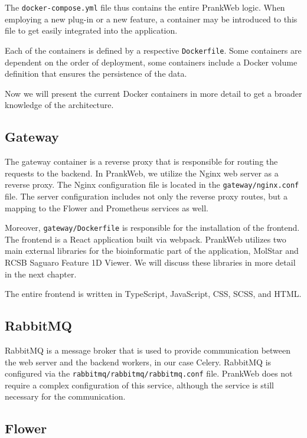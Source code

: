 The \texttt{docker-compose.yml} file thus contains the entire PrankWeb logic. When employing a new plug-in or a new feature, a container may be introduced to this file to get easily integrated into the application.

Each of the containers is defined by a respective \texttt{Dockerfile}. Some containers are dependent on the order of deployment, some containers include a Docker volume definition that ensures the persistence of the data.

Now we will present the current Docker containers in more detail to get a broader knowledge of the architecture.

\subsection{Gateway}

The gateway container is a reverse proxy that is responsible for routing the requests to the backend. In PrankWeb, we utilize the Nginx web server as a reverse proxy. The Nginx configuration file is located in the \texttt{gateway/nginx.conf} file. The server configuration includes not only the reverse proxy routes, but a mapping to the Flower and Prometheus services as well.

Moreover, \texttt{gateway/Dockerfile} is responsible for the installation of the frontend. The frontend is a React application built via webpack. PrankWeb utilizes two main external libraries for the bioinformatic part of the application, MolStar and RCSB Saguaro Feature 1D Viewer. We will discuss these libraries in more detail in the next chapter.

The entire frontend is written in TypeScript, JavaScript, CSS, SCSS, and HTML.

\subsection{RabbitMQ}

RabbitMQ is a message broker that is used to provide communication between the web server and the backend workers, in our case Celery. RabbitMQ is configured via the \texttt{rabbitmq/rabbitmq/rabbitmq.conf} file. PrankWeb does not require a complex configuration of this service, although the service is still necessary for the communication.

\subsection{Flower}

